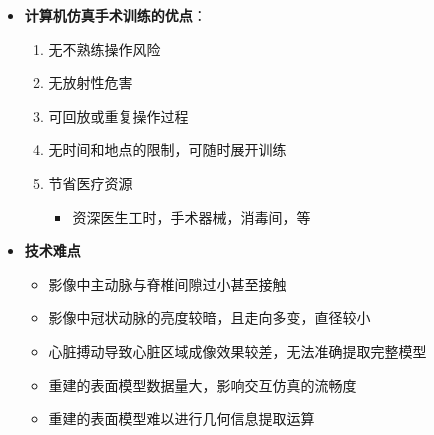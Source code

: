 \begin{frame}
\begin{itemize}
  \item \textbf{计算机仿真手术训练的优点}：
  \begin{enumerate}
     \item 无不熟练操作风险
     \item 无放射性危害
     \item 可回放或重复操作过程
     \item 无时间和地点的限制，可随时展开训练
     \item 节省医疗资源
	\begin{itemize}
	\item 资深医生工时，手术器械，消毒间，等
	\end{itemize}
  \end{enumerate}
\end{itemize}
\end{frame}

\begin{frame}
\begin{itemize}
\item \textbf{技术难点}
\begin{itemize}
\pause \item 影像中主动脉与脊椎间隙过小甚至接触
\pause \item 影像中冠状动脉的亮度较暗，且走向多变，直径较小
\pause \item 心脏搏动导致心脏区域成像效果较差，无法准确提取完整模型
\pause \item 重建的表面模型数据量大，影响交互仿真的流畅度
\pause \item 重建的表面模型难以进行几何信息提取运算
\end{itemize}
\end{itemize}
\end{frame}

